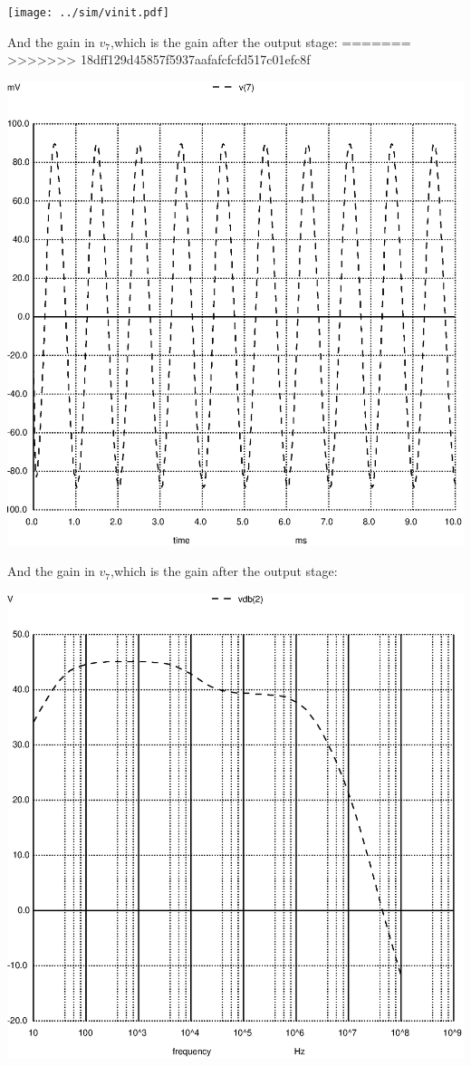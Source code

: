 \texttt{[image: ../sim/vinit.pdf]}

And the gain in $v_7$,which is the gain after the output stage:
=======
>>>>>>> 18dff129d45857f5937aafafcfcfd517c01efc8f

\includegraphics[width=1\linewidth]{../sim/vo1.ps}

And the gain in $v_7$,which is the gain after the output stage:

\includegraphics[width=1\linewidth]{../sim/vo1f.ps}

